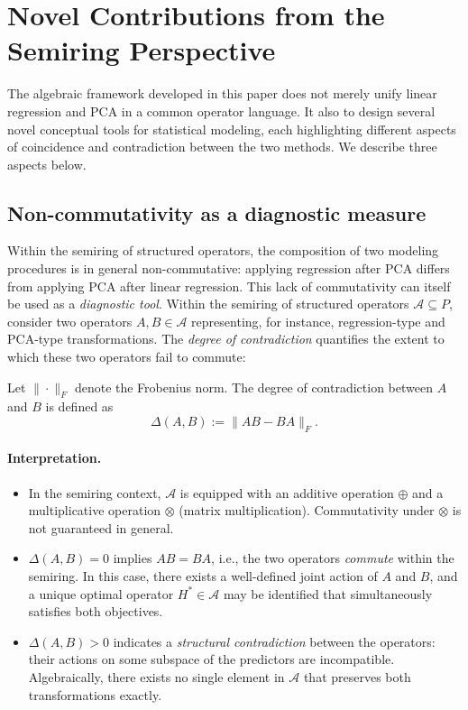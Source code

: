 \section{Novel Contributions from the Semiring Perspective}

The algebraic framework developed in this paper does not merely unify linear regression and PCA in a common operator language. It also to design several novel 
conceptual tools for statistical modeling, each highlighting different aspects of coincidence and contradiction between the two methods. 
We describe three aspects below.

\subsection{Non-commutativity as a diagnostic measure}

Within the semiring of structured operators, the composition of two modeling procedures is in general non-commutative: applying regression after PCA differs from applying PCA after linear regression. This lack of commutativity can itself be used as a \emph{diagnostic tool}. Within the semiring of structured operators $\mathcal{A} \subseteq P$, consider two operators $A, B \in \mathcal{A}$ representing, for instance, regression-type and PCA-type transformations. The \emph{degree of contradiction} quantifies the extent to which these two operators fail to commute:

\begin{defn}
Let $\|\cdot\|_F$ denote the Frobenius norm. The degree of contradiction between $A$ and $B$ is defined as
\[
\Delta(A,B) := \| AB - BA \|_F.
\]
\end{defn}

\paragraph{Interpretation.}
\begin{itemize}
    \item In the semiring context, $\mathcal{A}$ is equipped with an additive operation $\oplus$ 
          and a multiplicative operation $\otimes$ (matrix multiplication). 
          Commutativity under $\otimes$ is not guaranteed in general. 
    \item $\Delta(A,B) = 0$ implies $AB = BA$, i.e., the two operators \emph{commute} within the semiring. 
          In this case, there exists a well-defined joint action of $A$ and $B$, and a unique optimal operator 
          $H^* \in \mathcal{A}$ may be identified that simultaneously satisfies both objectives.
    \item $\Delta(A,B) > 0$ indicates a \emph{structural contradiction} between the operators: 
          their actions on some subspace of the predictors are incompatible. 
          Algebraically, there exists no single element in $\mathcal{A}$ that preserves both transformations exactly.
\end{itemize}

